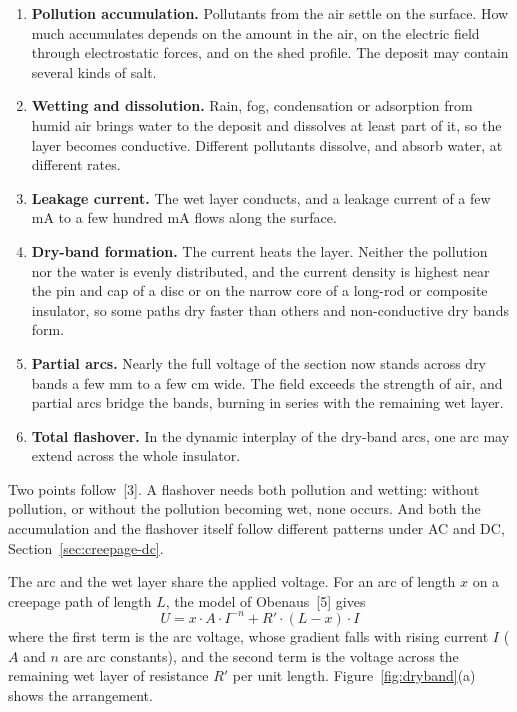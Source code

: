 \begin{enumerate}[itemsep=0.2em]
  \item \textbf{Pollution accumulation.} Pollutants from the air settle on
        the surface. How much accumulates depends on the amount in the air,
        on the electric field through electrostatic forces, and on the shed
        profile. The deposit may contain several kinds of salt.
  \item \textbf{Wetting and dissolution.} Rain, fog, condensation or
        adsorption from humid air brings water to the deposit and dissolves
        at least part of it, so the layer becomes conductive. Different
        pollutants dissolve, and absorb water, at different rates.
  \item \textbf{Leakage current.} The wet layer conducts, and a leakage
        current of a few mA to a few hundred mA flows along the surface.
  \item \textbf{Dry-band formation.} The current heats the layer. Neither the
        pollution nor the water is evenly distributed, and the current density
        is highest near the pin and cap of a disc or on the narrow core of a
        long-rod or composite insulator, so some paths dry faster than others
        and non-conductive dry bands form.
  \item \textbf{Partial arcs.} Nearly the full voltage of the section now
        stands across dry bands a few mm to a few cm wide. The field exceeds
        the strength of air, and partial arcs bridge the bands, burning in
        series with the remaining wet layer.
  \item \textbf{Total flashover.} In the dynamic interplay of the dry-band
        arcs, one arc may extend across the whole insulator.
\end{enumerate}

Two points follow~[3]. A flashover needs both pollution and wetting: without
pollution, or without the pollution becoming wet, none occurs. And both the
accumulation and the flashover itself follow different patterns under AC and
DC, Section~\ref{sec:creepage-dc}.

The arc and the wet layer share the applied voltage. For an arc of length $x$
on a creepage path of length $L$, the model of Obenaus~[5] gives
\begin{equation}
  U = x \cdot A \cdot I^{-n} + R' \cdot (L - x) \cdot I
  \label{eq:obenaus}
\end{equation}
where the first term is the arc voltage, whose gradient falls with rising
current $I$ ($A$ and $n$ are arc constants), and the second term is the
voltage across the remaining wet layer of resistance $R'$ per unit length.
Figure~\ref{fig:dryband}(a) shows the arrangement.

